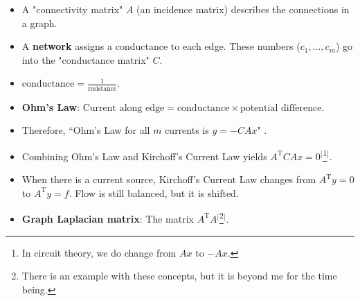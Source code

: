 \documentclass[titlepage]{article}
\numberwithin{figure}{section}
\newcommand{\dq}[4][]{``#2"#1 \cite[#4]{#3}.}
\newcommand{\T}{\text{T}}
\begin{document}
\begin{itemize}
    \item A "connectivity matrix" $A$ (an incidence matrix) describes the connections in a graph.
    \item A \textbf{network} assigns a conductance to each edge. These numbers ($c_1,\dots,c_m$) go into the "conductance matrix" $C$.
    \item $\text{conductance}=\frac{1}{\text{resistance}}$.
    \item \textbf{Ohm's Law}: $\text{Current along edge}=\text{conductance}\times\text{potential difference}$.
    \item Therefore, \dq{Ohm's Law for all $m$ currents is $y=-CAx$}{bib:Strang}{426}
    \item Combining Ohm's Law and Kirchoff's Current Law yields $A^\T CAx=0$$^[$\footnote{In circuit theory, we do change from $Ax$ to $-Ax$.}$^]$.
    \item When there is a current source, Kirchoff's Current Law changes from $A^\T y=0$ to $A^\T y=f$. Flow is still balanced, but it is shifted.
    \item \textbf{Graph Laplacian matrix}: The matrix $A^\T A$$^[$\footnote{There is an example with these concepts, but it is beyond me for the time being.}$^]$.
\end{itemize}
\newpage





\end{document}

